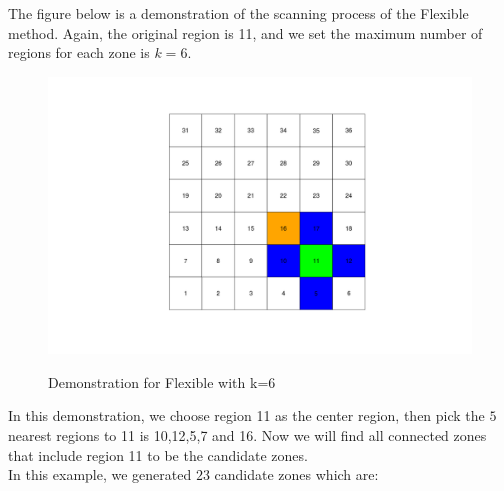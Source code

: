 \documentclass[12pt]{article}
\begin{document}
\begin{enumerate}
	
	The figure below is a demonstration of the scanning process of the Flexible method. Again, the original region is 11, and we set the maximum number of regions for each zone is $k=6$.\\
	\begin{figure}[!ht]
		
		\centering
		\includegraphics[scale=0.4]{Demo_Flexible}\\
		\caption{Demonstration for Flexible with k=6 \label{f:gull}}
		
	\end{figure}
	
	
	
	In this demonstration, we choose region 11 as the center region, then pick the $5$ nearest regions to 11 is 10,12,5,7 and 16. Now we will find all connected zones that include region 11 to be the candidate zones.  \\  
	
	In this example, we generated $23$ candidate zones which are: \\
	
	
		

\end{enumerate}
\end{document}
